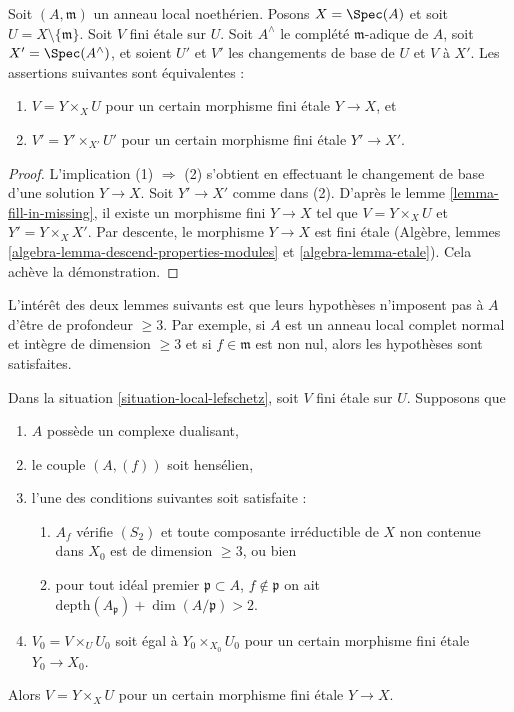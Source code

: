 \begin{lemma}
\label{lemma-purity-and-completion}
Soit $(A, \mathfrak m)$ un anneau local noethérien. Posons $X = \Spec(A)$
et soit $U = X \setminus \{\mathfrak m\}$.
Soit $V$ fini étale sur $U$.
Soit $A^\wedge$ le complété $\mathfrak m$-adique de $A$,
soit $X' = \Spec(A^\wedge)$, et soient $U'$ et $V'$ les changements de base de
$U$ et $V$ à $X'$. Les assertions suivantes sont équivalentes :
\begin{enumerate}
\item $V = Y \times_X U$ pour un certain morphisme fini étale $Y \to X$, et
\item $V' = Y' \times_{X'} U'$ pour un certain morphisme fini étale $Y' \to X'$.
\end{enumerate}
\end{lemma}

\begin{proof}
L'implication (1) $\Rightarrow$ (2) s'obtient en effectuant le changement de base
d'une solution $Y \to X$. Soit $Y' \to X'$ comme dans (2).
D'après le lemme \ref{lemma-fill-in-missing}, il existe un morphisme fini $Y \to X$
tel que $V = Y \times_X U$ et $Y' = Y \times_X X'$.
Par descente, le morphisme $Y \to X$ est fini étale
(Algèbre, lemmes \ref{algebra-lemma-descend-properties-modules} et
\ref{algebra-lemma-etale}). Cela achève la démonstration.
\end{proof}

\noindent
L'intérêt des deux lemmes suivants est que leurs hypothèses n'imposent pas à
$A$ d'être de profondeur $\geq 3$. Par exemple, si $A$ est un anneau local complet
normal et intègre de dimension $\geq 3$ et si $f \in \mathfrak m$ est non nul,
alors les hypothèses sont satisfaites.

\begin{lemma}
\label{lemma-lift-simple}
Dans la situation \ref{situation-local-lefschetz}, soit $V$ fini
étale sur $U$. Supposons que
\begin{enumerate}
\item[(a)] $A$ possède un complexe dualisant,
\item[(b)] le couple $(A, (f))$ soit hensélien,
\item[(c)] l'une des conditions suivantes soit satisfaite :
\begin{enumerate}
\item[(i)] $A_f$ vérifie $(S_2)$ et toute composante irréductible de $X$
non contenue dans $X_0$ est de dimension $\geq 3$, ou bien
\item[(ii)] pour tout idéal premier $\mathfrak p \subset A$, $f \not \in \mathfrak p$
on ait $\text{depth}(A_\mathfrak p) + \dim(A/\mathfrak p) > 2$.
\end{enumerate}
\item[(d)] $V_0 = V \times_U U_0$ soit égal à $Y_0 \times_{X_0} U_0$
pour un certain morphisme fini étale $Y_0 \to X_0$.
\end{enumerate}
Alors $V = Y \times_X U$ pour un certain morphisme fini étale $Y \to X$.
\end{lemma}

